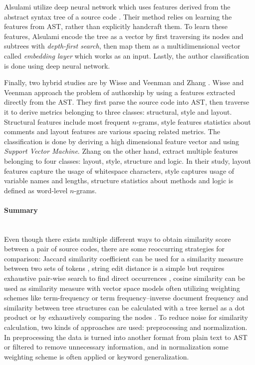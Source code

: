 Alsulami \etal utilize deep neural network which uses features derived from the abstract syntax tree of a source code \cite{SCAANN2017}. Their method relies on learning the features from AST, rather than explicitly handcraft them. To learn these features, Alsulami \etal encode the tree as a vector by first traversing its nodes and subtrees with \emph{depth-first search}, then map them as a multidimensional vector called \emph{embedding layer} which works as an input. Lastly, the author classification is done using deep neural network. 

Finally, two hybrid studies are by Wisse and Veenman \cite{SDNAIJSP2015} and Zhang \etal \cite{AISC2017}. Wisse and Veenman approach the problem of authorship by using a features extracted directly from the AST. They first parse the source code into AST, then traverse it to derive metrics belonging to three classes: structural, style and layout. Structural features include most frequent $n$-grams, style features statistics about comments and layout features are various spacing related metrics. The classification is done by deriving a high dimensional feature vector and using \emph{Support Vector Machine}. Zhang \etal on the other hand, extract multiple features belonging to four classes: layout, style, structure and logic. In their study, layout features capture the usage of whitespace characters, style captures usage of variable names and lengths, structure statistics about methods and logic is defined as word-level $n$-grams.

\paragraph{Summary}\mbox{}\\
Even though there exists multiple different ways to obtain similarity score between a pair of source codes, there are some reoccurring strategies for comparison: Jaccard similarity coefficient can be used for a similarity measure between two sets of tokens \cite{PACASCD2005, BUAA2009, OTIOLSS2015, ramirez2015high}, string edit distance is a simple but requires exhaustive pair-wise search to find direct occurrences \cite{LICD2010, ASTMLPD2013, CPDPPD2013}, cosine similarity can be used as similarity measure with vector space models often utilizing weighting schemes like term-frequency or term frequency–inverse document frequency \cite{AASCPD2012, USCR2014, Heblikar2015NormalizationBS, OTIOLSS2015, ramirez2015high} and similarity between tree structures can be calculated with a tree kernel as a dot product or by exhaustively comparing the nodes \cite{AAPSCDPTK2013, Fu2017WASTKAW, TBCFPD2012}. To reduce noise for similarity calculation, two kinds of approaches are used: preprocessing and normalization. In preprocessing the data is turned into another format \eg from plain text to AST or filtered to remove unnecessary information, and in normalization some weighting scheme is often applied or keyword generalization.

